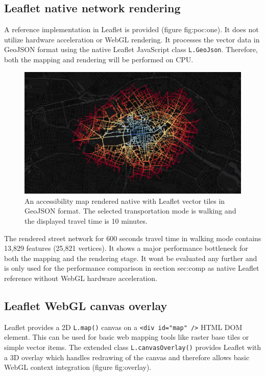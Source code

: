     \subsection{Leaflet native network rendering}
      A reference implementation in Leaflet is provided (figure {fig:poc:one}). It does not utilize hardware acceleration or WebGL rendering. It processes the vector data in GeoJSON format using the native Leaflet JavaScript class \texttt{L.GeoJson}. Therefore, both the mapping and rendering will be performed on CPU.\par
      \begin{figure}[h]
        \centering
        \includegraphics[width=0.7\linewidth]{./img/screenshot-poc1-600s-native.png}
        \caption{An accessibility map rendered native with Leaflet vector tiles in GeoJSON format. The selected transportation mode is walking and the displayed travel time is 10 minutes.}
        \label{fig:poc:one}
      \end{figure}
      The rendered street network for 600 seconds travel time in walking mode contains 13,829 features (25,821 vertices). It shows a major performance bottleneck for both the mapping and the rendering stage. It wont be evaluated any further and is only used for the performance comparison in section {sec:comp} as native Leaflet reference without WebGL hardware acceleration.

    \subsection{Leaflet WebGL canvas overlay}
      Leaflet provides a 2D \texttt{L.map()} canvas on a \texttt{<div id="map" />} HTML DOM element. This can be used for basic web mapping tools like raster base tiles or simple vector items. The extended class \texttt{L.canvasOverlay()} provides Leaflet with a 3D overlay which handles redrawing of the canvas and therefore allows basic WebGL context integration (figure {fig:overlay}).



